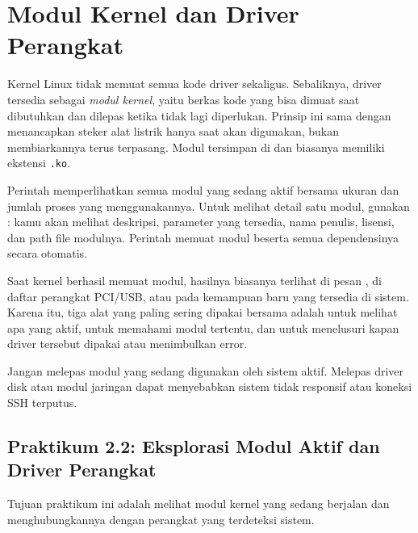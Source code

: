 \section{Modul Kernel dan Driver Perangkat}
\label{sec:kernel-modules}

Kernel Linux tidak memuat semua kode driver sekaligus. Sebaliknya, driver tersedia sebagai \textit{modul kernel}, yaitu berkas kode yang bisa dimuat saat dibutuhkan dan dilepas ketika tidak lagi diperlukan. Prinsip ini sama dengan menancapkan steker alat listrik hanya saat akan digunakan, bukan membiarkannya terus terpasang. Modul tersimpan di  dan biasanya memiliki ekstensi \texttt{.ko}.

Perintah  memperlihatkan semua modul yang sedang aktif bersama ukuran dan jumlah proses yang menggunakannya. Untuk melihat detail satu modul, gunakan : kamu akan melihat deskripsi, parameter yang tersedia, nama penulis, lisensi, dan path file modulnya. Perintah  memuat modul beserta semua dependensinya secara otomatis.

Saat kernel berhasil memuat modul, hasilnya biasanya terlihat di pesan , di daftar perangkat PCI/USB, atau pada kemampuan baru yang tersedia di sistem. Karena itu, tiga alat yang paling sering dipakai bersama adalah  untuk melihat apa yang aktif,  untuk memahami modul tertentu, dan  untuk menelusuri kapan driver tersebut dipakai atau menimbulkan error.

\begin{warningbox}
Jangan melepas modul yang sedang digunakan oleh sistem aktif. Melepas driver disk atau modul jaringan dapat menyebabkan sistem tidak responsif atau koneksi SSH terputus.
\end{warningbox}

\subsection*{Praktikum 2.2: Eksplorasi Modul Aktif dan Driver Perangkat}

Tujuan praktikum ini adalah melihat modul kernel yang sedang berjalan dan menghubungkannya dengan perangkat yang terdeteksi sistem.

